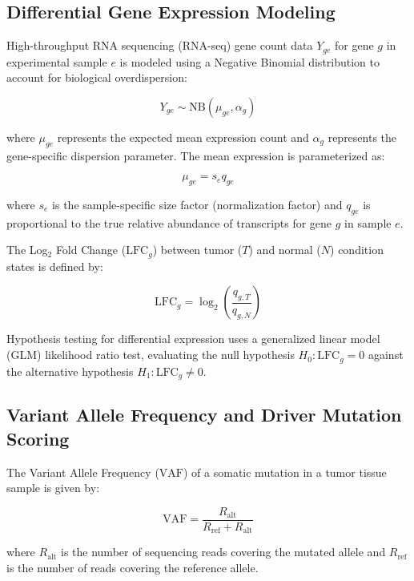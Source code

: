 \documentclass{article}
\begin{document}
\subsection{Differential Gene Expression Modeling}

High-throughput RNA sequencing (RNA-seq) gene count data $Y_{ge}$ for gene $g$ in experimental sample $e$ is modeled using a Negative Binomial distribution to account for biological overdispersion:

\begin{equation}
Y_{ge} \sim \text{NB}\left(\mu_{ge}, \alpha_g\right)
\end{equation}

where $\mu_{ge}$ represents the expected mean expression count and $\alpha_g$ represents the gene-specific dispersion parameter. The mean expression is parameterized as:

\begin{equation}
\mu_{ge} = s_e q_{ge}
\end{equation}

where $s_e$ is the sample-specific size factor (normalization factor) and $q_{ge}$ is proportional to the true relative abundance of transcripts for gene $g$ in sample $e$.

The Log$_2$ Fold Change ($\text{LFC}_g$) between tumor ($T$) and normal ($N$) condition states is defined by:

\begin{equation}
\text{LFC}_g = \log_2 \left( \frac{q_{g,T}}{q_{g,N}} \right)
\end{equation}

Hypothesis testing for differential expression uses a generalized linear model (GLM) likelihood ratio test, evaluating the null hypothesis $H_0: \text{LFC}_g = 0$ against the alternative hypothesis $H_1: \text{LFC}_g \neq 0$.

\subsection{Variant Allele Frequency and Driver Mutation Scoring}

The Variant Allele Frequency ($\text{VAF}$) of a somatic mutation in a tumor tissue sample is given by:

\begin{equation}
\text{VAF} = \frac{R_{\text{alt}}}{R_{\text{ref}} + R_{\text{alt}}}
\end{equation}

where $R_{\text{alt}}$ is the number of sequencing reads covering the mutated allele and $R_{\text{ref}}$ is the number of reads covering the reference allele.
\end{document}
